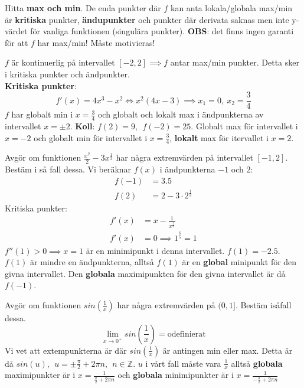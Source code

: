 \documentclass{report}
\begin{document}
\noindent
Hitta \textbf{max och min}. De enda punkter där $ f $ kan anta lokala/globala max/min är \textbf{kritiska} punkter, \textbf{ändupunkter} och punkter där derivata saknas men inte y-värdet för vanliga funktionen (singulära punkter). \textbf{OBS}: det finns ingen garanti för att $ f $ har max/min! Måste motivieras!

\pagebreak
{}
{
	$ f $ är kontinuerlig på intervallet $ [-2,2]  \implies f$ antar max/min punkter. Detta sker i kritiska punkter och ändpunkter.\\
	\textbf{Kritiska punkter}:
	\begin{equation*}
	f'(x) = 4x^3-x^2 \iff x^2(4x-3) \implies x_1 = 0,\:x_2 = \frac{3}{4} 
	\end{equation*}
	$ f $ har globalt min i $ x= \frac{3}{4}  $ och globalt och lokalt max i ändpunkterna av intervallet $ x = \pm 2 $. \textbf{Koll}: $ f(2) = 9,\:\:f(-2) = 25 $. Globalt max för intervallet i $ x = -2 $ och globalt min för intervallet i $ x = \frac{3}{4}  $, \textbf{lokalt} max för itervallet i $ x = 2 $. 
}

\qs{}
{
	Avgör om funktionen $ \frac{x^2}{2} -3x^{ \frac{1}{3} } $ har några extremvärden på intervallet $ [-1,2] $. Bestäm i så fall dessa.
}
\sol Vi beräknar $ f(x) $ i ändpunkterna $ -1 $ och $ 2 $:
\begin{align*}
	f(-1) &= 3.5\\
	f(2) &= 2-3 \cdot 2^{ \frac{1}{3} }
\end{align*}
Kritiska punkter:
\begin{align*}
	f'(x) &= x - \frac{1}{x ^ { \frac{2}{3} }} \\
	f'(x) &= 0 \implies 1^{ \frac{6}{5} } = 1
\end{align*}
$ f''(1) > 0 \implies x=1 $ är en minimipunkt i denna intervallet. $ f(1) = -2.5 $. $ f(1) $ är mindre en ändpunkterna, alltså $ f(1) $ är en \textbf{global} minipunkt för den givna intervallet. Den \textbf{globala} maximipunkten för den givna intervallet är då $ f(-1) $.   

\vspace{20pt}
\qs{}
{
	Avgör om funktionen $ sin( \frac{1}{x} ) $ har några extremvärden på $ (0,1] $. Bestäm isåfall dessa. 
}
\sol
\begin{equation*}
\lim_{x \to 0^+} sin( \frac{1}{x} ) = \text{odefinierat} 
\end{equation*}
Vi vet att extempunkterna är där $ sin( \frac{1}{x} ) $ är antingen min eller max. Detta är då $ sin(u),\:\:u = \pm \frac{\pi}{2} + 2\pi n,\:\: n \in \mathbb{Z} $. $ u $ i vårt fall måste vara $ \frac{1}{x}  $ alltså \textbf{globala} maximipunkter är i $ x = \frac{1}{ \frac{\pi}{2} + 2\pi n}  $  och \textbf{globala} minimipunkter är i $ x = \frac{1}{- \frac{\pi}{2} + 2 \pi n}  $   
\end{document}
